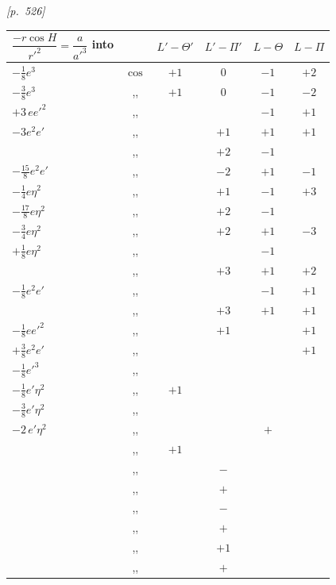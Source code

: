 \documentclass[11pt]{article}
\begin{document}

\newpage
\noindent\textit{[p.~526]}

\medskip

\begin{center}
\begin{tabular}{|l|c|c|c|c|c|}
\hline
$\dfrac{-r\cos H}{r'^2}=\dfrac{a}{a'^3}$ into & & $L'-\Theta'$ & $L'-\Pi'$ & $L-\Theta$ & $L-\Pi$ \\
\hline
$-\tfrac{1}{8}e^3$ & $\cos$ & $+1$ & $0$ & $-1$ & $+2$ \\
$-\tfrac{3}{8}e^3$ & ,, & $+1$ & $0$ & $-1$ & $-2$ \\
$+3\,ee'^2$ & ,, & & & $-1$ & $+1$ \\
$-3e^2e'$ & ,, & & $+1$ & $+1$ & $+1$ \\
 & ,, & & $+2$ & $-1$ & \\
$-\tfrac{15}{8}e^2e'$ & ,, & & $-2$ & $+1$ & $-1$ \\
$-\tfrac{1}{4}e\eta^2$ & ,, & & $+1$ & $-1$ & $+3$ \\
$-\tfrac{17}{8}e\eta^2$ & ,, & & $+2$ & $-1$ & \\
$-\tfrac{3}{4}e\eta^2$ & ,, & & $+2$ & $+1$ & $-3$ \\
$+\tfrac{1}{8}e\eta^2$ & ,, & & & $-1$ & \\
 & ,, & & $+3$ & $+1$ & $+2$ \\
$-\tfrac{1}{8}e^2e'$ & ,, & & & $-1$ & $+1$ \\
 & ,, & & $+3$ & $+1$ & $+1$ \\
$-\tfrac{1}{8}ee'^2$ & ,, & & $+1$ & & $+1$ \\
$+\tfrac{3}{8}e^2e'$ & ,, & & & & $+1$ \\
$-\tfrac{1}{8}e'^3$ & ,, & & & & \\
$-\tfrac{1}{8}e'\eta^2$ & ,, & $+1$ & & & \\
$-\tfrac{3}{8}e'\eta^2$ & ,, & & & & \\
$-2\,e'\eta^2$ & ,, & & & $+$ & \\
 & ,, & $+1$ & & & \\
 & ,, & & $-$ & & \\
 & ,, & & $+$ & & \\
 & ,, & & $-$ & & \\
 & ,, & & $+$ & & \\
 & ,, & & $+1$ & & \\
 & ,, & & $+$ & & \\
\hline
\end{tabular}
\end{center}
\end{document}
